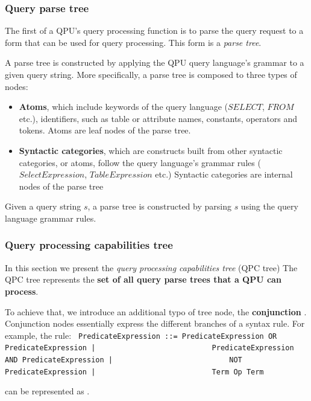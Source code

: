 \subsubsection{Query parse tree}

The first of a QPU's query processing function is to parse the query request to a form that can be used for query processing.
This form is a \textit{parse tree}.

A parse tree is constructed by applying the QPU query language's grammar to a given query string.
More specifically, a parse tree is composed to three types of nodes:
\begin{itemize}
  \item \textbf{Atoms}, which include keywords of the query language ($SELECT$, $FROM$ etc.),
  identifiers, such as table or attribute names, constants, operators and tokens.
  Atoms are leaf nodes of the parse tree.

  \item \textbf{Syntactic categories}, which are constructs built from other syntactic categories, or atoms,
  follow the query language's grammar rules ($SelectExpression$, $TableExpression$ etc.)
  Syntactic categories are internal nodes of the parse tree
\end{itemize}

Given a query string $s$, a parse tree is constructed by parsing $s$ using the query language grammar rules.

\subsubsection{Query processing capabilities tree}
\label{sec:qpc_tree}

In this section we present the \textit{query processing capabilities tree} (QPC tree)
The QPC tree represents the \textbf{set of all query parse trees that a QPU can process}.

To achieve that, we introduce an additional typo of tree node, the \textbf{conjunction} .
Conjunction nodes essentially express the different branches of a syntax rule.
For example, the rule:
{\obeylines\obeyspaces
\texttt{
PredicateExpression  ::=  PredicateExpression OR PredicateExpression |
~~~~~~~~~~~~~~~~~~~~~~~~~~PredicateExpression AND PredicateExpression |
~~~~~~~~~~~~~~~~~~~~~~~~~~NOT PredicateExpression |
~~~~~~~~~~~~~~~~~~~~~~~~~~Term Op Term
}}

can be represented as .


